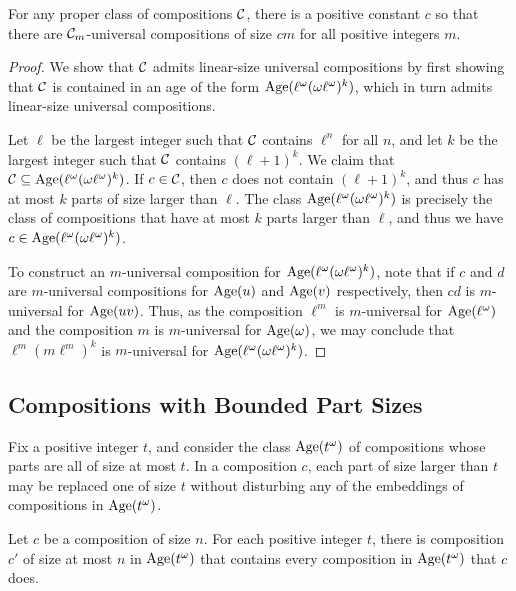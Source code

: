 \begin{theorem}
\label{thm-comp-universal-proper}
	For any proper class of compositions $\mathcal{C}$, there is a positive constant $c$ so that there are $\mathcal{C}_m$-universal compositions of size $cm$ for all positive integers $m$.
\end{theorem}
\begin{proof}
	We show that $\mathcal{C}$ admits linear-size universal compositions by first showing that $\mathcal{C}$ is contained in an age of the form $\operatorname{Age}(\ell^\omega (\omega \ell^\omega)^k)$, which in turn admits linear-size universal compositions.

	Let $\ell$ be the largest integer such that $\mathcal{C}$ contains $\ell^n$ for all $n$, and let $k$ be the largest integer such that $\mathcal{C}$ contains $(\ell + 1)^k$. We claim that $\mathcal{C} \subseteq \operatorname{Age}(\ell^\omega (\omega \ell^\omega)^k)$. If $c \in \mathcal{C}$, then $c$ does not contain $(\ell + 1)^k$, and thus $c$ has at most $k$ parts of size larger than $\ell$. The class $\operatorname{Age}(\ell^\omega (\omega \ell^\omega)^k)$ is precisely the class of compositions that have at most $k$ parts larger than $\ell$, and thus we have $c \in \operatorname{Age}(\ell^\omega (\omega \ell^\omega)^k)$.

	To construct an $m$-universal composition for $\operatorname{Age}(\ell^\omega (\omega \ell^\omega)^k)$, note that if $c$ and $d$ are $m$-universal compositions for $\operatorname{Age}(u)$ and $\operatorname{Age}(v)$ respectively, then $cd$ is $m$-universal for $\operatorname{Age}(uv)$. Thus, as the composition $\ell^m$ is $m$-universal for $\operatorname{Age}(\ell^\omega)$ and the composition $m$ is $m$-universal for $\operatorname{Age}(\omega)$, we may conclude that $\ell^m (m \ell^m)^k$ is $m$-universal for $\operatorname{Age}(\ell^\omega (\omega \ell^\omega)^k)$.
\end{proof}

\subsection{Compositions with Bounded Part Sizes}
\label{subsec-comp-bdd-pt-size}

Fix a positive integer $t$, and consider the class $\operatorname{Age}(t^\omega)$ of compositions whose parts are all of size at most $t$. In a composition $c$, each part of size larger than $t$ may be replaced one of size $t$ without disturbing any of the embeddings of compositions in $\operatorname{Age}(t^\omega)$. 
\begin{observation}
	Let $c$ be a composition of size $n$. For each positive integer $t$, there is composition $c'$ of size at most $n$ in $\operatorname{Age}(t^\omega)$ that contains every composition in $\operatorname{Age}(t^\omega)$ that $c$ does.
\end{observation}

